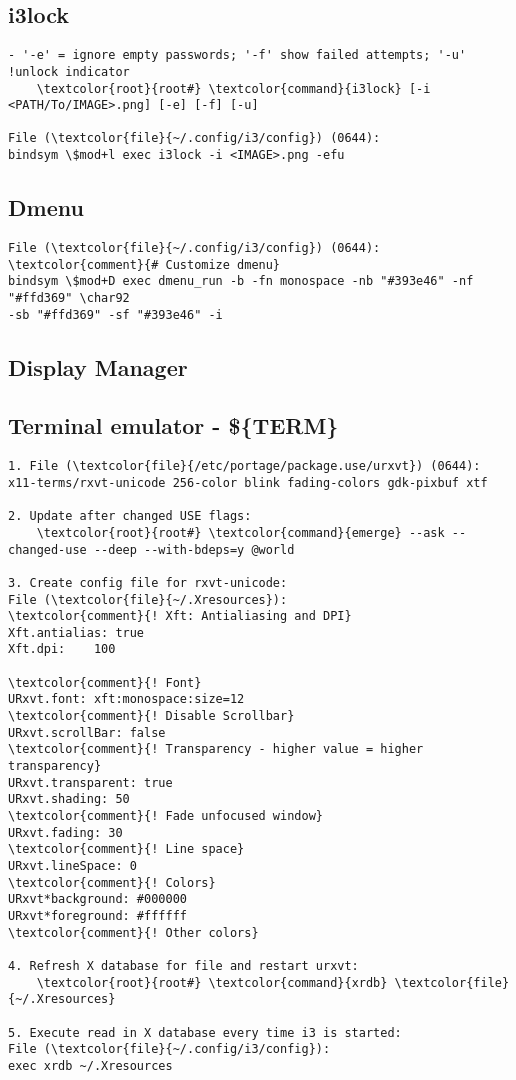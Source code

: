 \documentclass[10pt, a4paper, onecolumn, openany]{book}         %
\begin{document}
\subsection{i3lock}
\begin{Verbatim}[commandchars=\\\{\}]
- '-e' = ignore empty passwords; '-f' show failed attempts; '-u' !unlock indicator
    \textcolor{root}{root#} \textcolor{command}{i3lock} [-i <PATH/To/IMAGE>.png] [-e] [-f] [-u]
    
File (\textcolor{file}{~/.config/i3/config}) (0644):
bindsym \$mod+l exec i3lock -i <IMAGE>.png -efu
\end{Verbatim}



\subsection{Dmenu}
\begin{Verbatim}[commandchars=\\\{\}]
File (\textcolor{file}{~/.config/i3/config}) (0644):
\textcolor{comment}{# Customize dmenu}
bindsym \$mod+D exec dmenu_run -b -fn monospace -nb "#393e46" -nf "#ffd369" \char92
-sb "#ffd369" -sf "#393e46" -i
\end{Verbatim}
\subsection{Display Manager}


\subsection{Terminal emulator - \$\{TERM\}}
\begin{Verbatim}[commandchars=\\\{\}]
1. File (\textcolor{file}{/etc/portage/package.use/urxvt}) (0644):
x11-terms/rxvt-unicode 256-color blink fading-colors gdk-pixbuf xtf

2. Update after changed USE flags:
    \textcolor{root}{root#} \textcolor{command}{emerge} --ask --changed-use --deep --with-bdeps=y @world

3. Create config file for rxvt-unicode:
File (\textcolor{file}{~/.Xresources}):
\textcolor{comment}{! Xft: Antialiasing and DPI}
Xft.antialias: true
Xft.dpi:    100

\textcolor{comment}{! Font}
URxvt.font: xft:monospace:size=12
\textcolor{comment}{! Disable Scrollbar}
URxvt.scrollBar: false
\textcolor{comment}{! Transparency - higher value = higher transparency}
URxvt.transparent: true
URxvt.shading: 50
\textcolor{comment}{! Fade unfocused window}
URxvt.fading: 30
\textcolor{comment}{! Line space}
URxvt.lineSpace: 0
\textcolor{comment}{! Colors}
URxvt*background: #000000
URxvt*foreground: #ffffff
\textcolor{comment}{! Other colors}

4. Refresh X database for file and restart urxvt:
    \textcolor{root}{root#} \textcolor{command}{xrdb} \textcolor{file}{~/.Xresources}
    
5. Execute read in X database every time i3 is started:
File (\textcolor{file}{~/.config/i3/config}):
exec xrdb ~/.Xresources
\end{Verbatim}
\end{document}
